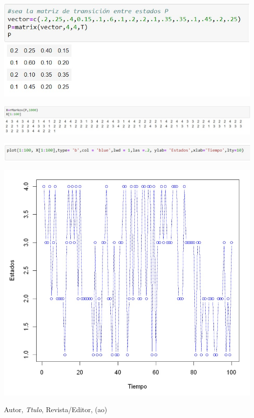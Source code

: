 \documentclass[10pt,a4paper]{article}
\theoremstyle{definition}
\theoremstyle{remark}
\newenvironment{Figure}
  {\par\medskip\noindent\minipage{\linewidth}}
  {\endminipage\par\medskip}
\begin{document}
\begin{multicols}{2}
\begin{Figure}
	\centering
	\includegraphics[scale=0.26]{fun2.jpeg}
	\label{figura2}
\end{Figure}

\begin{Figure}
	\centering
	\includegraphics[scale=0.20]{fun3.jpeg}
	\label{figura3}
\end{Figure}

\begin{Figure}
	\centering
	\includegraphics[scale=0.25]{fun4.jpeg}
	\label{figura4}
\end{Figure}

\begin{Figure}
	\centering
	\includegraphics[scale=0.2]{fun5.jpeg}
	\label{figura5}
\end{Figure}

\end{multicols}
\begin{thebibliography}{99}

 Autor, \emph{Ttulo}, Revista/Editor, (ao)

\end{thebibliography}
\end{document}
